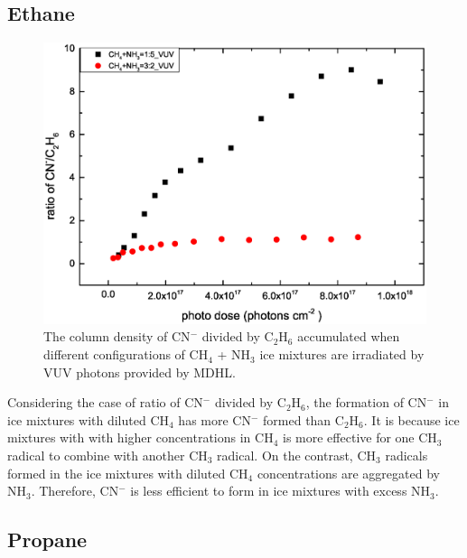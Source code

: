 \subsection{Ethane}


\begin{figure}
\centering
\includegraphics[width=\textwidth]{figures/chapter3/CN_C2H6.eps}
\caption{The column density of CN$^-$ divided by C$_2$H$_6$ accumulated when different configurations of CH$_4$ + NH$_3$ ice mixtures are irradiated by VUV photons provided by MDHL.}
\label{fig:C2H6_CN}
\end{figure}

Considering the case of ratio of CN$^-$ divided by C$_2$H$_6$, the formation of CN$^-$ in ice mixtures with diluted CH$_4$ has more CN$^-$ formed than C$_2$H$_6$. It is because ice mixtures with with higher concentrations in CH$_4$ is more effective for one CH$_3$ radical to combine with another CH$_3$ radical. On the contrast, CH$_3$ radicals formed in the ice mixtures with diluted CH$_4$ concentrations are aggregated by NH$_3$. Therefore, CN$^-$ is less efficient to form in ice mixtures with excess NH$_3$.

\subsection{Propane}

